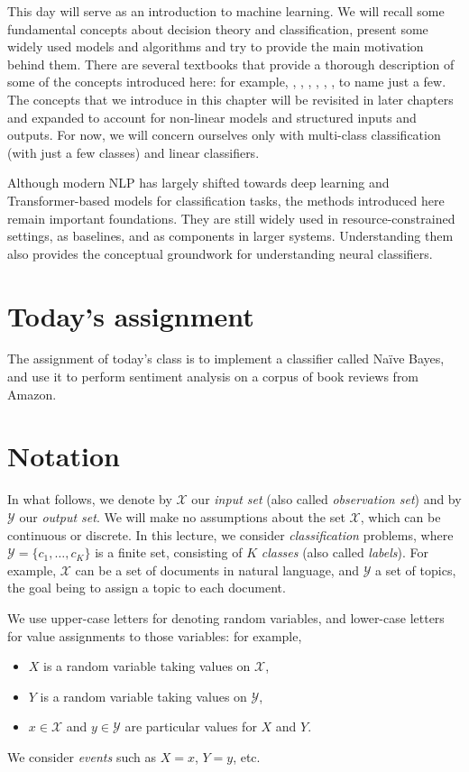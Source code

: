 This day will serve as an introduction to machine learning. We will recall some fundamental concepts
about decision theory and classification, present some widely used models and algorithms
and try to provide the main motivation behind them.
There are several textbooks that provide a thorough description of some of the concepts introduced here:
for example, \citet{Mitchell1997}, \citet{Duda2001}, \citet{Schoelkopf2002}, \citet{Joachims2002}, \citet{Bishop2006}, \citet{Manning2008},
to name just a few.
The concepts that we introduce in this chapter will be revisited in later chapters and expanded to account for
non-linear models and structured inputs and outputs. For now, we will concern ourselves only with multi-class classification
(with just a few classes) and linear classifiers.

Although modern NLP has largely shifted towards deep learning and Transformer-based models for classification tasks, the methods introduced here remain important foundations. They are still widely used in resource-constrained settings, as baselines, and as components in larger systems. Understanding them also provides the conceptual groundwork for understanding neural classifiers.

\section*{Today's assignment}

The assignment of today's class is to implement a classifier called Na\"{i}ve Bayes, and use it to perform sentiment analysis on a corpus of book reviews from Amazon.


\section{Notation}

In what follows, we denote by $\mathcal{X}$ our \emph{input set} (also called \emph{observation set}) and by $\mathcal{Y}$ our \emph{output set}. 
We will make no assumptions about the set $\mathcal{X}$, which can be continuous or discrete. In this lecture, we 
consider \emph{classification} problems, where $\mathcal{Y} = \{c_1,\ldots,c_K\}$ is a finite set, consisting of $K$ \emph{classes} (also called \emph{labels}). 
For example, $\mathcal{X}$ can be a set of documents in natural language, and $\mathcal{Y}$ a set of topics, the goal 
being to assign a topic to each document. 

We use upper-case letters for denoting random variables, and lower-case letters for value assignments to those variables: for example,
\begin{itemize}
\item $X$ is a random variable taking values on $\mathcal{X}$,
\item $Y$ is a random variable taking values on $\mathcal{Y}$,
\item $x \in \mathcal{X}$ and $y \in \mathcal{Y}$ are particular values for $X$ and $Y$. 
\end{itemize}  
We consider \emph{events} such as $X=x$, $Y=y$, etc. 


